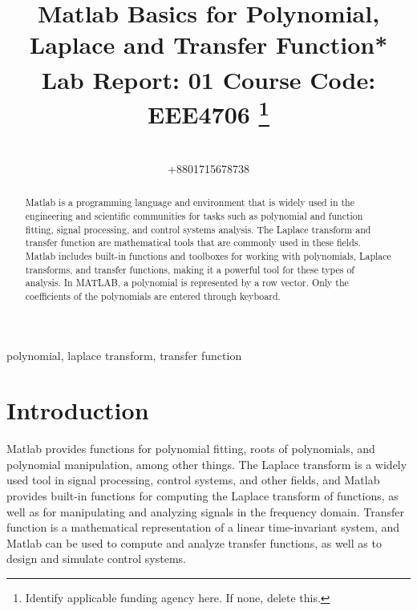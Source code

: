 \documentclass[conference]{IEEEtran}
\begin{document}
\title{Matlab Basics for Polynomial, Laplace and Transfer Function*\\
{\footnotesize \textsuperscript{}Lab Report: 01}
{\footnotesize \textsuperscript{} Course Code: EEE4706}
\thanks{Identify applicable funding agency here. If none, delete this.}
}

\author{
\\+8801715678738

}

\maketitle

\begin{abstract}
Matlab is a programming language and environment that is widely used in the engineering and scientific communities for tasks such as polynomial and function fitting, signal processing, and control systems analysis. The Laplace transform and transfer function are mathematical tools that are commonly used in these fields. Matlab includes built-in functions and toolboxes for working with polynomials, Laplace transforms, and transfer functions, making it a powerful tool for these types of analysis. In MATLAB, a polynomial is represented by a row vector. Only the coefficients of the polynomials are entered through keyboard. 


\end{abstract}

\begin{IEEEkeywords}
polynomial, laplace transform, transfer function
\end{IEEEkeywords}

\section{Introduction}
Matlab provides functions for polynomial fitting, roots of polynomials, and polynomial manipulation, among other things. The Laplace transform is a widely used tool in signal processing, control systems, and other fields, and Matlab provides built-in functions for computing the Laplace transform of functions, as well as for manipulating and analyzing signals in the frequency domain. Transfer function is a mathematical representation of a linear time-invariant system, and Matlab can be used to compute and analyze transfer functions, as well as to design and simulate control systems.
\end{document}
